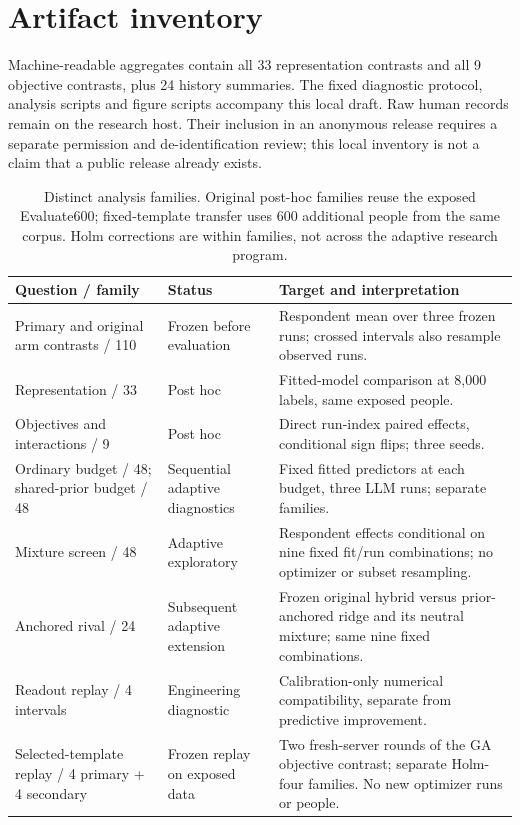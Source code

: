 \documentclass[10pt,twocolumn]{article}
\begin{document}
\section{Artifact inventory}
Machine-readable aggregates contain all 33 representation contrasts and all 9
objective contrasts, plus 24 history summaries. The fixed diagnostic protocol,
analysis scripts and figure scripts accompany this local draft. Raw human
records remain on the research host. Their inclusion in an anonymous release
requires a separate permission and de-identification review; this local
inventory is not a claim that a public release already exists.
\begin{table}[t]\centering\small
\caption{Distinct analysis families. Original post-hoc families reuse the
exposed Evaluate600; fixed-template transfer uses 600 additional people from
the same corpus. Holm corrections are within families, not across the adaptive
research program.}\label{tab:evidence-map}
\begin{tabular}{@{}p{}p{}p{}@{}}\toprule
Question / family & Status & Target and interpretation\\\midrule
Primary and original arm contrasts / 110 & Frozen before evaluation & Respondent mean over three frozen runs; crossed intervals also resample observed runs.\\
Representation / 33 & Post hoc & Fitted-model comparison at 8,000 labels, same exposed people.\\
Objectives and interactions / 9 & Post hoc & Direct run-index paired effects, conditional sign flips; three seeds.\\
Ordinary budget / 48; shared-prior budget / 48 & Sequential adaptive diagnostics & Fixed fitted predictors at each budget, three LLM runs; separate families.\\
Mixture screen / 48 & Adaptive exploratory & Respondent effects conditional on nine fixed fit/run combinations; no optimizer or subset resampling.\\
Anchored rival / 24 & Subsequent adaptive extension & Frozen original hybrid versus prior-anchored ridge and its neutral mixture; same nine fixed combinations.\\
Readout replay / 4 intervals & Engineering diagnostic & Calibration-only numerical compatibility, separate from predictive improvement.\\
Selected-template replay / 4 primary + 4 secondary & Frozen replay on exposed data & Two fresh-server rounds of the GA objective contrast; separate Holm-four families. No new optimizer runs or people.\\

\end{tabular}
\end{table}
\end{document}
